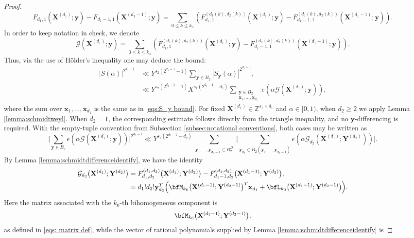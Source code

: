 \documentclass[12pt,reqno]{amsart}
\theoremstyle{definition}
\theoremstyle{remark}
\numberwithin{equation}{section}
\def\bfx{{\mathbf x}}
\def\bfy{{\mathbf y}}
\def\bfX{{\mathbf X}}
\def\bfY{{\mathbf Y}}
\def\calG{{\mathcal G}}
\def\Z{{\mathbb Z}}\def\Q{{\mathbb Q}}
\def\a{{\alpha}} \def\bfalp{{\boldsymbol \alpha}} \def\atil{{\widetilde \alpha}}
\def\le{\leqslant} \def\ge{\geqslant} \def\pleq{\preccurlyeq} \def\ple{\prec}
\begin{document}
\begin{proof}
    \[F_{d_1,1}(\bfX^{(d_1)};\bfy)-F_{d_1-1,1}(\bfX^{(d_1 -1)};\bfy) = \sum_{0 \le k \le k_0} \left(F^{(d_1(k),d_2(k))}_{d_1,1}(\bfX^{(d_1)};\bfy) - F_{d_1 -1,1}^{(d_1(k),d_2(k))}(\bfX^{(d_1 - 1)};\bfy)\right).\]
    In order to keep notation in check, we denote
    \[\calG(\bfX^{(d_1)};\bfy) = \sum_{0 \le k \le k_0} \left(F^{(d_1(k),d_2(k))}_{d_1,1}(\bfX^{(d_1)};\bfy) - F_{d_1 -1,1}^{(d_1(k),d_2(k))}(\bfX^{(d_1 - 1)};\bfy)\right).\]
    Thus, via the use of H\"{o}lder's inequality one may deduce the bound:
    \begin{align*}
        |S(\a)|^{2^{d_1 - 1}} &\ll Y^{s_2(2^{d_1 - 1}-1)} \sum_{\bfy \in B_2} |S_{\bfy}(\a)|^{2^{d_1 - 1}}, \\
        &\ll Y^{s_2(2^{d_1 - 1}-1)} X^{s_1(2^{d_1-1}-d_1)} \sum_{\substack{\bfy \in B_2 \\ \bfx_1,\ldots,\bfx_{d_1}}} e\left(\a \calG(\bfX^{(d_1)};\bfy) \right),
    \end{align*}
    where the sum over $\bfx_1,\ldots,\bfx_{d_1}$ is the same as in \eqref{eqs:S_y bound}. For fixed $\bfX^{(d_1)} \in \Z^{s_1 \times d_1}$ and $\a \in [0,1)$, when $d_2\geq2$ we apply Lemma \ref{lemma:schmidtweyl}. When $d_2=1$, the corresponding estimate follows directly from the triangle inequality, and no $\bfy$-differencing is required. With the empty-tuple convention from Subsection \ref{subsec:notational conventions}, both cases may be written as
    \[\Big|\sum_{\bfy \in B_2}e( \a \calG(\bfX^{(d_1)};\bfy)) \Big|^{2^{d_2 - 1}} \ll Y^{s_2(2^{d_2-1} -d_2)}  \sum_{\substack{\bfy_1,\ldots,\bfy_{d_2-1} \in B_2^D }} \Big|\sum_{\bfy_{d_2} \in B_2(\bfy_1,\ldots,\bfy_{d_2-1})} e( \a \calG_{d_2}(\bfX^{(d_1)};\bfY^{(d_2)})) \Big| .\]
    By Lemma \ref{lemma:schmidtdifferenceidentify}, we have the identity
    \begin{align*}
        \calG_{d_2} \bigl(\bfX^{(d_1)};\bfY^{(d_2)}\bigr) &= F^{(d_1,d_2)}_{d_1,d_2} \bigl(\bfX^{(d_1)};\bfY^{(d_2)}\bigr) -
    F^{(d_1,d_2)}_{d_1-1,d_2} \bigl(\bfX^{(d_1-1)};\bfY^{(d_2)}\bigr), \\
    &= d_1!d_2! \bfy_{d_2}^{T}
    \Bigl(
        \bfM_{k_0}\bigl(\bfX^{(d_1-1)};\bfY^{(d_2-1)}\bigr)^{T}\bfx_{d_1}
        +\bfL_{k_0}\bigl(\bfX^{(d_1-1)};\bfY^{(d_2-1)}\bigr)
    \Bigr).
    \end{align*}
    Here the matrix associated with the $k_0$-th bihomogeneous component is
    \[
        \bfM_{k_0}\bigl(\bfX^{(d_1-1)};\bfY^{(d_2-1)}\bigr),
    \]
    as defined in \eqref{eqs: matrix def}, while the vector of rational
    polynomials supplied by Lemma \ref{lemma:schmidtdifferenceidentify} is

\end{proof}
\end{document}

